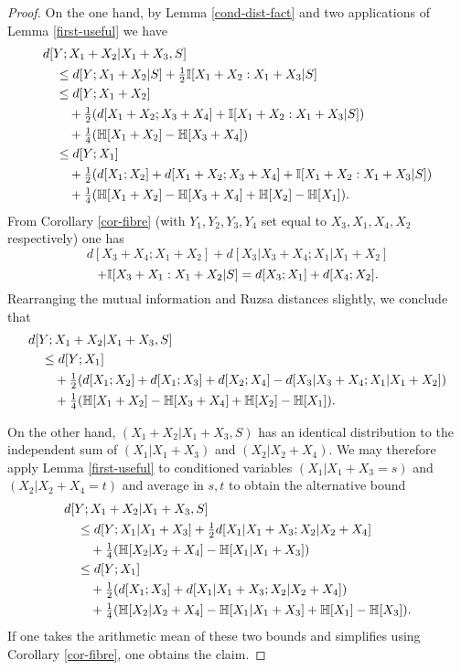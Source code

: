 \begin{proof}
  On the one hand, by Lemma \ref{cond-dist-fact} and two applications of Lemma \ref{first-useful} we have
  \begin{align*}
  &d[Y;X_1+X_2|X_1 + X_3, S] \\
  &\quad \leq d[Y;X_1+X_2|S] + \tfrac{1}{2} \mathbb{I}[X_1 + X_2 : X_1 + X_3|S] \\
  &\quad \leq d[Y;X_1+X_2]\\
  &\qquad + \tfrac{1}{2} (d[X_1+X_2;X_3+X_4] + \mathbb{I}[X_1 + X_2 : X_1 + X_3|S])\\
  &\qquad + \tfrac{1}{4} (\mathbb{H}[X_1+X_2] - \mathbb{H}[X_3+X_4])\\
  &\quad \leq d[Y;X_1] \\
  &\qquad + \tfrac{1}{2} (d[X_1;X_2] + d[X_1+X_2;X_3+X_4] + \mathbb{I}[X_1 + X_2 : X_1 + X_3|S])\\
  &\qquad + \tfrac{1}{4} (\mathbb{H}[X_1+X_2] - \mathbb{H}[X_3+X_4] + \mathbb{H}[X_2] - \mathbb{H}[X_1]).
  \end{align*}
  From Corollary \ref{cor-fibre} (with $Y_1,Y_2,Y_3,Y_4$ set equal to $X_3, X_1, X_4, X_2$ respectively) one has
  $$ d[X_3+X_4; X_1+X_2] + d[X_3|X_3+X_4; X_1|X_1+X_2] $$
  $$ + \mathbb{I}[X_3 + X_1 : X_1 + X_2|S] = d[X_3;X_1] + d[X_4;X_2].$$
Rearranging the mutual information and Ruzsa distances slightly, we conclude that
\begin{align*}
  &d[Y;X_1+X_2|X_1 + X_3, S] \\
  &\quad \leq d[Y;X_1] \\
  &\qquad + \tfrac{1}{2} (d[X_1;X_2] + d[X_1;X_3] + d[X_2;X_4] - d[X_3|X_3+X_4; X_1|X_1+X_2])\\
  &\qquad + \tfrac{1}{4} (\mathbb{H}[X_1+X_2] - \mathbb{H}[X_3+X_4] + \mathbb{H}[X_2] - \mathbb{H}[X_1]).
  \end{align*}



  On the other hand, $(X_1+X_2|X_1 + X_3, S)$ has an identical distribution to the independent sum of $(X_1|X_1+X_3)$ and $(X_2|X_2+X_4)$.  We may therefore apply Lemma \ref{first-useful} to conditioned variables $(X_1|X_1+X_3=s)$ and $(X_2|X_2+X_4=t)$ and average in $s,t$ to
  obtain the alternative bound
  \begin{align*}
  &  d[Y;X_1+X_2|X_1 + X_3, S] \\
  &\quad \leq d[Y;X_1|X_1+X_3] + \tfrac{1}{2} d[X_1|X_1+X_3; X_2|X_2+X_4] \\
  &\qquad + \tfrac{1}{4} (\mathbb{H}[X_2|X_2+X_4] - \mathbb{H}[X_1|X_1+X_3]) \\
  &\quad  \leq d[Y;X_1] \\
  &\qquad + \tfrac{1}{2} (d[X_1;X_3] + d[X_1|X_1+X_3;X_2|X_2+X_4])\\
  &\qquad + \tfrac{1}{4} (\mathbb{H}[X_2|X_2+X_4] - \mathbb{H}[X_1|X_1+X_3] + \mathbb{H}[X_1] - \mathbb{H}[X_3]).
  \end{align*}
  If one takes the arithmetic mean of these two bounds and simplifies using Corollary \ref{cor-fibre}, one obtains the claim.
\end{proof}

